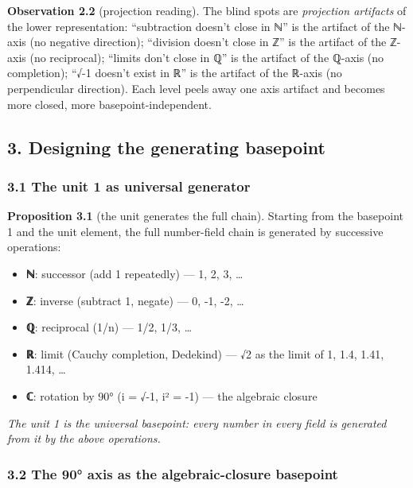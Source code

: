 \documentclass[
]{article}
\providecommand{\tightlist}{%
  \setlength{\itemsep}{0pt}\setlength{\parskip}{0pt}}
\begin{document}
\textbf{Observation 2.2} (projection reading). The blind spots are
\emph{projection artifacts} of the lower representation: ``subtraction
doesn't close in ℕ'' is the artifact of the ℕ-axis (no negative
direction); ``division doesn't close in ℤ'' is the artifact of the
ℤ-axis (no reciprocal); ``limits don't close in ℚ'' is the artifact of
the ℚ-axis (no completion); ``√-1 doesn't exist in ℝ'' is the artifact
of the ℝ-axis (no perpendicular direction). Each level peels away one
axis artifact and becomes more closed, more basepoint-independent.

\subsection{3. Designing the generating
basepoint}\label{designing-the-generating-basepoint}

\subsubsection{3.1 The unit 1 as universal
generator}\label{the-unit-1-as-universal-generator}

\textbf{Proposition 3.1} (the unit generates the full chain). Starting
from the basepoint 1 and the unit element, the full number-field chain
is generated by successive operations:

\begin{itemize}
\tightlist
\item
  \textbf{ℕ}: successor (add 1 repeatedly) --- 1, 2, 3, \ldots{}
\item
  \textbf{ℤ}: inverse (subtract 1, negate) --- 0, -1, -2, \ldots{}
\item
  \textbf{ℚ}: reciprocal (1/n) --- 1/2, 1/3, \ldots{}
\item
  \textbf{ℝ}: limit (Cauchy completion, Dedekind) --- √2 as the limit of
  1, 1.4, 1.41, 1.414, \ldots{}
\item
  \textbf{ℂ}: rotation by 90° (i = √-1, i² = -1) --- the algebraic
  closure
\end{itemize}

\emph{The unit 1 is the universal basepoint: every number in every field
is generated from it by the above operations.}

\subsubsection{3.2 The 90° axis as the algebraic-closure
basepoint}\label{the-90-axis-as-the-algebraic-closure-basepoint}
\end{document}
